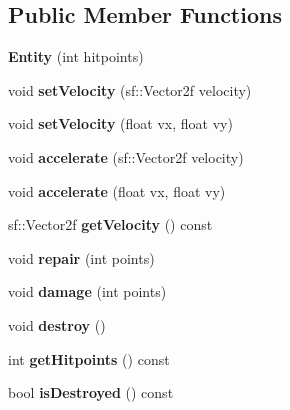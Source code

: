 \subsection*{Public Member Functions}
\begin{DoxyCompactItemize}
\item 
\hypertarget{class_entity_a305ac3dd729c288ab23db531fa3fb7e6}{}{\bfseries Entity} (int hitpoints)\label{class_entity_a305ac3dd729c288ab23db531fa3fb7e6}

\item 
\hypertarget{class_entity_a5bf79843c973eac1fdbebfd1fc83a1e8}{}void {\bfseries set\+Velocity} (sf\+::\+Vector2f velocity)\label{class_entity_a5bf79843c973eac1fdbebfd1fc83a1e8}

\item 
\hypertarget{class_entity_a7873fbd61cf1a742d4492ec438a9ac9f}{}void {\bfseries set\+Velocity} (float vx, float vy)\label{class_entity_a7873fbd61cf1a742d4492ec438a9ac9f}

\item 
\hypertarget{class_entity_a80cdb89f11d47716781bc567efd2bcda}{}void {\bfseries accelerate} (sf\+::\+Vector2f velocity)\label{class_entity_a80cdb89f11d47716781bc567efd2bcda}

\item 
\hypertarget{class_entity_a2ff2403c455f15b3fe5d04e922b3943d}{}void {\bfseries accelerate} (float vx, float vy)\label{class_entity_a2ff2403c455f15b3fe5d04e922b3943d}

\item 
\hypertarget{class_entity_ad428181660f03f4a800461e1810e5937}{}sf\+::\+Vector2f {\bfseries get\+Velocity} () const \label{class_entity_ad428181660f03f4a800461e1810e5937}

\item 
\hypertarget{class_entity_a354ea9f771b0758f8e70bdfac9a740b4}{}void {\bfseries repair} (int points)\label{class_entity_a354ea9f771b0758f8e70bdfac9a740b4}

\item 
\hypertarget{class_entity_a15660fa13012dbca80c8047e2cc6f1f5}{}void {\bfseries damage} (int points)\label{class_entity_a15660fa13012dbca80c8047e2cc6f1f5}

\item 
\hypertarget{class_entity_a691dbe5f9ec930c27af2af0b97907a9e}{}void {\bfseries destroy} ()\label{class_entity_a691dbe5f9ec930c27af2af0b97907a9e}

\item 
\hypertarget{class_entity_a23125d6943b71a3d9a43d5271262a654}{}int {\bfseries get\+Hitpoints} () const \label{class_entity_a23125d6943b71a3d9a43d5271262a654}

\item 
\hypertarget{class_entity_a3c86039d4c16de3490b52a8595440f47}{}bool {\bfseries is\+Destroyed} () const \label{class_entity_a3c86039d4c16de3490b52a8595440f47}

\end{DoxyCompactItemize}
